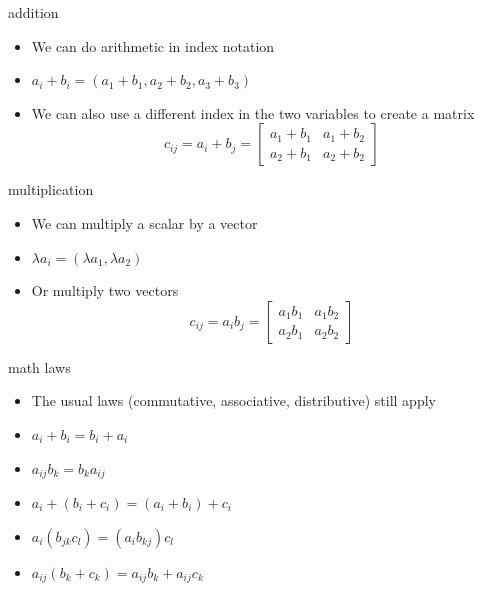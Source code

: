 \documentclass[
  letterpaper,
  ignorenonframetext,
  aspectratio=43,
  handout,
  12pt]{beamer}
\providecommand{\tightlist}{%
  \setlength{\itemsep}{0pt}\setlength{\parskip}{0pt}}
\providecommand{\tightlist}{%
\setlength{\itemsep}{0pt}\setlength{\parskip}{0pt}}
\begin{document}
\begin{frame}{addition}
\protect\hypertarget{addition}{}
\begin{itemize}
\tightlist
\item
  We can do arithmetic in index notation
\item
  \(a_i + b_i = (a_1+b_1, a_2+b_2, a_3+b_3)\)
\item
  We can also use a different index in the two variables to create a
  matrix \[c_{ij} = a_i + b_j = \begin{bmatrix}
  a_1 + b_1 & a_1 + b_2 \\
  a_2 + b_1 & a_2 + b_2
  \end{bmatrix}\]
\end{itemize}
\end{frame}

\begin{frame}{multiplication}
\protect\hypertarget{multiplication}{}
\begin{itemize}
\tightlist
\item
  We can multiply a scalar by a vector
\item
  \(\lambda a_i = (\lambda a_1, \lambda a_2)\)
\item
  Or multiply two vectors \[c_{ij} = a_i b_j = \begin{bmatrix}
  a_1 b_1 & a_1 b_2 \\
  a_2 b_1 & a_2 b_2
  \end{bmatrix}\]
\end{itemize}
\end{frame}

\begin{frame}{math laws}
\protect\hypertarget{math-laws}{}
\begin{itemize}
\tightlist
\item
  The usual laws (commutative, associative, distributive) still apply
\item
  \(a_i + b_i = b_i + a_i\)
\item
  \(a_{ij} b_k = b_k a_{ij}\)
\item
  \(a_i + (b_i + c_i) = (a_i + b_i) + c_i\)
\item
  \(a_i(b_{jk}c_l) = (a_i b_{kj})c_l\)
\item
  \(a_{ij}(b_k + c_k) = a_{ij}b_k + a_{ij}c_k\)
\end{itemize}
\end{frame}
\end{document}
